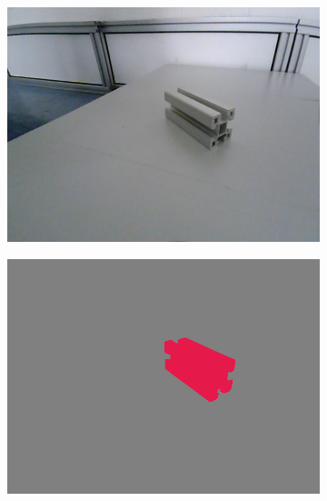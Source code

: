 	\begin{figure}[h]
		\centering
		\begin{subfigure}{.24\textwidth}
			\centering
			\includegraphics[width=1\linewidth]{images/sample_predictions/s40_40_G_013}
		\end{subfigure}
		\begin{subfigure}{.24\textwidth}
			\centering
			\includegraphics[width=1\linewidth]{images/sample_predictions/s40_40_G_013_binary_gt}
		\end{subfigure}
		\begin{subfigure}{.24\textwidth}
			\centering

\end{subfigure}
\end{figure}
